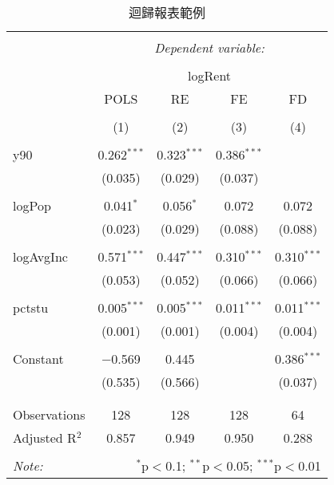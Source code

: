 
\begin{table}[!htbp] \centering 
  \caption{迴歸報表範例} 
  \label{tb:regTable} 
\begin{tabular}{@{\extracolsep{5pt}}lcccc} 
\\[-1.8ex]\hline 
\hline \\[-1.8ex] 
 & \multicolumn{4}{c}{\textit{Dependent variable:}} \\ 
\cline{2-5} 
\\[-1.8ex] & \multicolumn{4}{c}{logRent} \\ 
 & POLS & RE & FE & FD \\ 
\\[-1.8ex] & (1) & (2) & (3) & (4)\\ 
\hline \\[-1.8ex] 
 y90 & 0.262$^{***}$ & 0.323$^{***}$ & 0.386$^{***}$ &  \\ 
  & (0.035) & (0.029) & (0.037) &  \\ 
  & & & & \\ 
 logPop & 0.041$^{*}$ & 0.056$^{*}$ & 0.072 & 0.072 \\ 
  & (0.023) & (0.029) & (0.088) & (0.088) \\ 
  & & & & \\ 
 logAvgInc & 0.571$^{***}$ & 0.447$^{***}$ & 0.310$^{***}$ & 0.310$^{***}$ \\ 
  & (0.053) & (0.052) & (0.066) & (0.066) \\ 
  & & & & \\ 
 pctstu & 0.005$^{***}$ & 0.005$^{***}$ & 0.011$^{***}$ & 0.011$^{***}$ \\ 
  & (0.001) & (0.001) & (0.004) & (0.004) \\ 
  & & & & \\ 
 Constant & $-$0.569 & 0.445 &  & 0.386$^{***}$ \\ 
  & (0.535) & (0.566) &  & (0.037) \\ 
  & & & & \\ 
\hline \\[-1.8ex] 
Observations & 128 & 128 & 128 & 64 \\ 
Adjusted R$^{2}$ & 0.857 & 0.949 & 0.950 & 0.288 \\ 
\hline 
\hline \\[-1.8ex] 
\textit{Note:}  & \multicolumn{4}{r}{$^{*}$p$<$0.1; $^{**}$p$<$0.05; $^{***}$p$<$0.01} \\ 
\end{tabular} 
\end{table} 